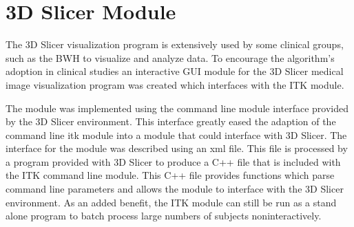 \section{3D Slicer Module}
The 3D Slicer visualization program is extensively used by some clinical groups, such as the BWH to visualize and analyze data.  To encourage the algorithm's adoption in clinical studies an interactive GUI module for the 3D Slicer medical image visualization program was created which interfaces with the ITK module.

The module was implemented using the command line module interface provided by the 3D Slicer environment.  This interface greatly eased the adaption of the command line itk module into a module that could interface with 3D Slicer.  The interface for the module was described using an xml file.  This file is processed by a program provided with 3D Slicer to produce a C++ file that is included with the ITK command line module.  This C++ file provides functions which parse command line parameters and allows the module to interface with the 3D Slicer environment.  As an added benefit, the ITK module can still be run as a stand alone program to batch process large numbers of subjects noninteractively.


